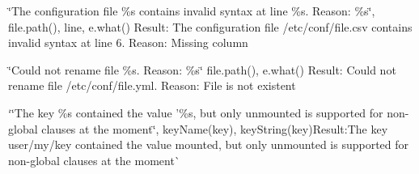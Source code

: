 \begin{DoxyItemize}
\item {\ttfamily \char`\"{}\+The configuration file \%s contains invalid syntax at line \%s. Reason\+: \%s\char`\"{}, file.\+path(), line, e.\+what()} Result\+: {\ttfamily The configuration file /etc/conf/file.csv contains invalid syntax at line 6. Reason\+: Missing column}
\item {\ttfamily \char`\"{}\+Could not rename file \%s. Reason\+: \%s\char`\"{} file.\+path(), e.\+what()} Result\+: {\ttfamily Could not rename file /etc/conf/file.yml. Reason\+: File is not existent}
\item `\char`\"{}\+The key \%s contained the value '\%s\textquotesingle{}, but only \textquotesingle{}unmounted\textquotesingle{} is supported for non-\/global clauses at the moment\char`\"{}, key\+Name(key), key\+String(key){\ttfamily  Result\+:}The key user/my/key contained the value \textquotesingle{}mounted\textquotesingle{}, but only \textquotesingle{}unmounted\textquotesingle{} is supported for non-\/global clauses at the moment\`{} 
\end{DoxyItemize}